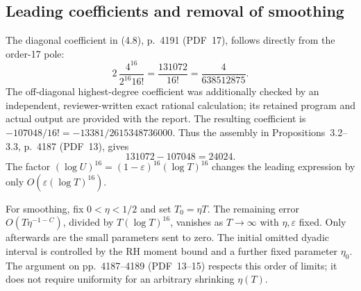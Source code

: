 \documentclass[10pt]{article}
\begin{document}
\subsection*{Leading coefficients and removal of smoothing}
The diagonal coefficient in (4.8), p. 4191 (PDF 17), follows directly from the order-17 pole: \[2\,\frac{4^{16}}{2^{16}16!}=\frac{131072}{16!}
=\frac4{638512875}.\] The off-diagonal highest-degree coefficient was additionally checked by an independent, reviewer-written exact rational calculation; its retained program and actual output are provided with the report. The resulting coefficient is \(-107048/16!=-13381/2615348736000\). Thus the assembly in Propositions 3.2–3.3, p. 4187 (PDF 13), gives \[131072-107048=24024.\] The factor \((\log U)^{16}=(1-\varepsilon)^{16}(\log T)^{16}\) changes the leading expression by only \(O(\varepsilon(\log T)^{16})\).\par
For smoothing, fix \(0<\eta<1/2\) and set \(T_0=\eta T\). The remaining error \(O(T\eta^{-1-C})\), divided by \(T(\log T)^{16}\), vanishes as \(T\to\infty\) with \(\eta,\varepsilon\) fixed. Only afterwards are the small parameters sent to zero. The initial omitted dyadic interval is controlled by the RH moment bound and a further fixed parameter \(\eta_0\). The argument on pp. 4187–4189 (PDF 13–15) respects this order of limits; it does not require uniformity for an arbitrary shrinking \(\eta(T)\).\par
\end{document}

